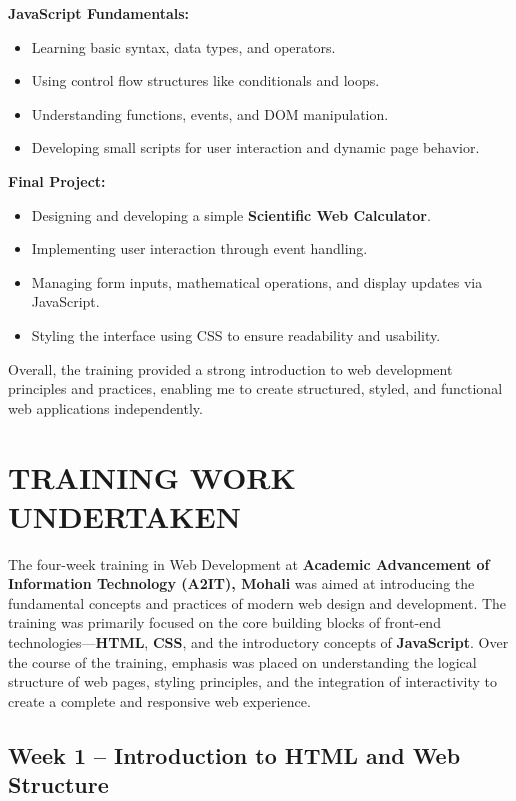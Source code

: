 \documentclass[a4paper,12pt,oneside]{report}
\numberwithin{equation}{chapter}
\numberwithin{figure}{chapter}
\numberwithin{table}{chapter}
\begin{document}
\textbf{JavaScript Fundamentals:}
\begin{itemize}
    \item Learning basic syntax, data types, and operators.
    \item Using control flow structures like conditionals and loops.
    \item Understanding functions, events, and DOM manipulation.
    \item Developing small scripts for user interaction and dynamic page behavior.
\end{itemize}

\textbf{Final Project:}
\begin{itemize}
    \item Designing and developing a simple \textbf{Scientific Web Calculator}.
    \item Implementing user interaction through event handling.
    \item Managing form inputs, mathematical operations, and display updates via JavaScript.
    \item Styling the interface using CSS to ensure readability and usability.
\end{itemize}

Overall, the training provided a strong introduction to web development principles and practices, enabling me to create structured, styled, and functional web applications independently.


\newpage
\chapter{TRAINING WORK UNDERTAKEN}

The four-week training in Web Development at \textbf{Academic Advancement of Information Technology (A2IT), Mohali} was aimed at introducing the fundamental concepts and practices of modern web design and development. The training was primarily focused on the core building blocks of front-end technologies—\textbf{HTML}, \textbf{CSS}, and the introductory concepts of \textbf{JavaScript}. Over the course of the training, emphasis was placed on understanding the logical structure of web pages, styling principles, and the integration of interactivity to create a complete and responsive web experience.

\vspace{5mm}
\noindent
\section{Week 1 – Introduction to HTML and Web Structure}
\end{document}
